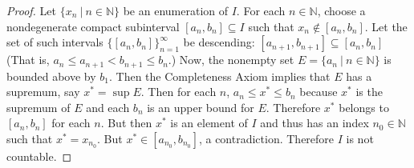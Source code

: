 \begin{flushleft}
\begin{proof}
Let $\{x_n \ |\ n \in \mathbb{N} \}$ be an enumeration of $I$. 
For each $n \in \mathbb{N}$, choose a nondegenerate compact subinterval $[a_n,b_n] \subseteq I$ such that $x_n \notin [a_n,b_n]$. 
Let the set of such intervals $\{[a_n,b_n]\}_{n=1}^\infty$ be descending: $[a_{n+1},b_{n+1}] \subseteq [a_n,b_n]$ (That is, $a_n \le a_{n+1}<b_{n+1}\le b_n$.)
Now, the nonempty set $E = \{a_n \ |\ n \in \mathbb{N} \}$ is bounded above by $b_1$.
Then the Completeness Axiom implies that $E$ has a supremum, say $x^* = \sup E$. 
Then for each $n$, $a_n \le x^* \le b_n$ because $x^*$ is the supremum of $E$ and each $b_n$ is an upper bound for $E$.
Therefore $x^*$ belongs to $[a_n,b_n]$ for each $n$.
But then $x^*$ is an element of $I$ and thus has an index $n_0 \in \mathbb{N}$ such that $x^* = x_{n_0}$. But $x^* \in [a_{n_0},b_{n_0}]$, a contradiction.
Therefore $I$ is not countable.
\end{proof}

\end{flushleft}

